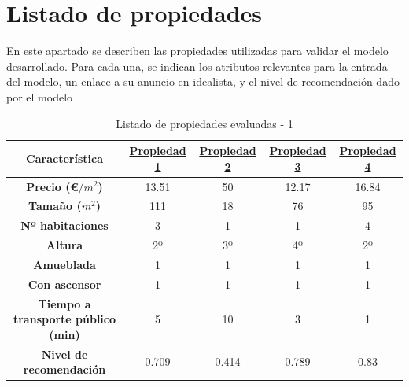 \documentclass[12pt]{report} %
\begin{document}
    \chapter{Listado de propiedades}
    \label{chap:propiedades}
    En este apartado se describen las propiedades utilizadas para validar el
    modelo desarrollado. Para cada una, se indican los atributos relevantes para
    la entrada del modelo, un enlace a su anuncio en
    \href{https://www.idealista.com}{idealista}, y el nivel de recomendación
    dado por el modelo

    \begin{table}[h]
        \center
        \begin{tabular}{|c|cccc|}
            \hline
            \textbf{Característica} & \href{https://www.idealista.com/inmueble/106565852/}{Propiedad 1} & \href{https://www.idealista.com/inmueble/103969285/}{Propiedad 2} & \href{https://www.idealista.com/inmueble/104278344/}{Propiedad 3} & \href{https://www.idealista.com/inmueble/106224752/}{Propiedad 4} \\
            \hline
            \hline
            \textbf{Precio (€$/m^2$)}                  & 13.51 & 50    & 12.17 & 16.84 \\
            \textbf{Tamaño ($m^2$)}                    & 111   & 18    & 76    & 95    \\
            \textbf{Nº habitaciones}                   & 3     & 1     & 1     & 4     \\
            \textbf{Altura}                            & 2º    & 3º    & 4º    & 2º    \\
            \textbf{Amueblada\footnotemark[1]}         & 1     & 1     & 1     & 1     \\
            \textbf{Con ascensor\footnotemark[1]}      & 1     & 1     & 1     & 1     \\
            \textbf{Tiempo a transporte público (min)} & 5     & 10    & 3     & 1     \\
            \textbf{Nivel de recomendación}            & 0.709 & 0.414 & 0.789 & 0.83  \\
            \hline
        \end{tabular}
        \caption{Listado de propiedades evaluadas - 1}
    \end{table}
\end{document}

